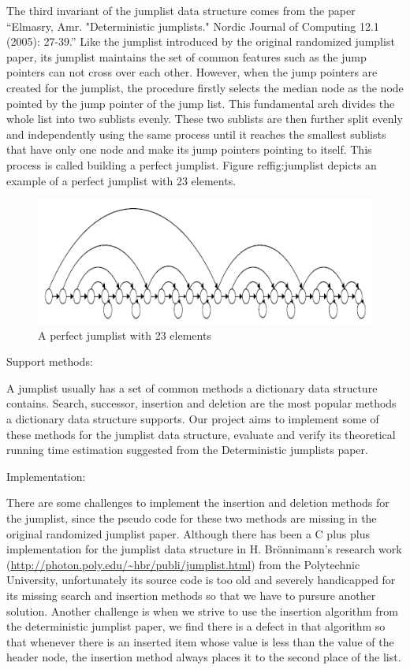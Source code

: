 \documentclass[oribibl]{llncs}
\begin{document}
The third invariant of the jumplist data structure comes from the paper “Elmasry, Amr. "Deterministic jumplists." Nordic Journal of Computing 12.1 (2005): 27-39.” Like the jumplist introduced by the original randomized jumplist paper, its jumplist maintains the set of common features such as the jump pointers can not cross over  each other. However, when the jump pointers are created for the jumplist, the procedure firstly selects the median node as the node pointed by the jump pointer of the jump list. This fundamental arch divides the whole list into two sublists evenly. These two sublists are then further split evenly and independently using the same process until it reaches the smallest sublists that have only one node and make its jump pointers pointing to itself. This process is called building a perfect jumplist. Figure ref{fig:jumplist} depicts an example of a perfect jumplist with 23 elements.


\begin{figure}[here]
\center
\includegraphics[width=12cm]{images/perfect_jumplist}
\caption{A perfect jumplist with 23 elements}
\label{fig:jumplist}
\end{figure}


Support methods:

A jumplist usually has a set of common methods a dictionary data structure contains. Search, successor, insertion and deletion are the most popular methods a dictionary data structure supports. Our project aims to implement some of these methods for the jumplist data structure, evaluate and verify its theoretical running time estimation suggested from the Deterministic jumplists paper.

Implementation:

There are some challenges to implement the insertion and deletion methods for the jumplist, since the pseudo code for these two methods are missing in the original randomized jumplist paper. Although there has been a C plus plus implementation for the jumplist data structure in H. Brönnimann’s research work (\url{http://photon.poly.edu/~hbr/publi/jumplist.html}) from the Polytechnic University, unfortunately its source code is too old and severely handicapped for its missing search and insertion methods so that we have to pursure another solution. Another challenge is when we strive to use the insertion algorithm from the deterministic jumplist paper, we find there is a defect in that algorithm so that whenever there is an inserted item whose value is less than the value of the header node, the insertion method always places it to the second place of the list.
\end{document}
